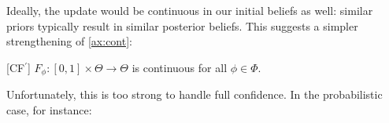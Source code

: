 
Ideally, the update would be continuous in our initial
beliefs as well: similar priors typically result
in similar posterior beliefs.
This suggests a simpler strengthening of \cref{ax:cont}:

\begin{CFaxioms}[nosep]
	\item
	[CF{\the\numexpr\value{CFaxiomsi}\relax}${^\prime}$]
	$F_\phi : [0,1] \times \Theta \to \Theta$ is continuous
	for all $\phi \in \Phi$.
	\label{ax:cont-strong}
\end{CFaxioms}

Unfortunately, this is too strong to handle full confidence.
In the probabilistic case, for instance:


